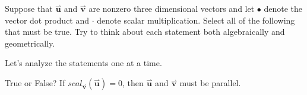\documentclass{ximera}
\author{Jim Talamo}
\begin{document}
\begin{exercise}
Suppose that $\overset{\boldsymbol{\rightharpoonup}}{\mathbf{u}}$ and $\overset{\boldsymbol{\rightharpoonup}}{\mathbf{v}}$ are nonzero three dimensional vectors and let $\bullet$ denote the vector dot product and $\cdot$ denote scalar multiplication.  Select all of the following that must be true.  Try to think about each statement both algebraically and geometrically.

\begin{selectAll}

\begin{hint}
Let's analyze the statements one at a time.
\begin{problem}
True or False? If $scal_{\overset{\boldsymbol{\rightharpoonup}}{\mathbf{v}}}(\overset{\boldsymbol{\rightharpoonup}}{\mathbf{u}}) =0$, then $\overset{\boldsymbol{\rightharpoonup}}{\mathbf{u}}$ and $\overset{\boldsymbol{\rightharpoonup}}{\mathbf{v}}$ must be parallel.


\end{problem}
\end{hint}
\end{selectAll}
\end{exercise}
\end{document}

